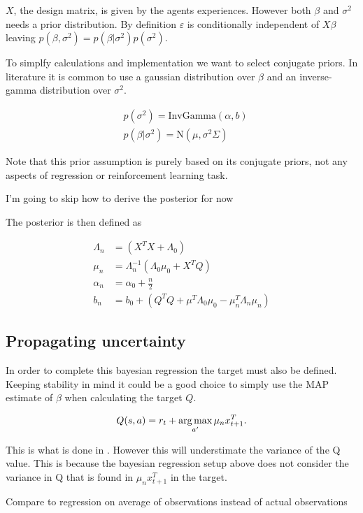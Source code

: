 $X$, the design matrix, is given by the agents experiences. However both $\beta$ and $\sigma^2$ needs a prior distribution. By definition $\varepsilon$ is conditionally independent of $X\beta$ leaving $p(\beta, \sigma^2) = p(\beta|\sigma^2)p(\sigma^2)$.

To simplfy calculations and implementation we want to select conjugate priors. In literature it is common to use a gaussian distribution over $\beta$ and an inverse-gamma distribution over $\sigma^2$.

\begin{align*}
&p(\sigma^2) = \text{InvGamma}(\alpha, b) \\
&p(\beta|\sigma^2) = \text{N}(\mu, \sigma^2\Sigma)
\end{align*}

Note that this prior assumption is purely based on its conjugate priors, not any aspects of regression or reinforcement learning task.

\todo I'm going to skip how to derive the posterior for now

The posterior is then defined as

\begin{align*}
\Lambda_n &= (X^TX + \Lambda_0)\\
\mu_n &= \Lambda_n^{-1}(\Lambda_0\mu_0 + X^TQ)\\
\alpha_n &= \alpha_0 + \frac{n}{2}\\
b_n &= b_0 + (Q^TQ + \mu^T\Lambda_0\mu_0 - \mu_n^T\Lambda_n\mu_n)
\end{align*}

\subsection{Propagating uncertainty}

In order to complete this bayesian regression the target must also be defined. Keeping stability in mind it could be a good choice to simply use the MAP estimate of $\beta$ when calculating the target $Q$.

\begin{equation*}
    Q(s,a) = r_t + \operatorname*{arg\,max}_{a'}\mu_nx_{t+1}^T.
\end{equation*}

This is what is done in \cite{azziz_2018}. However this will understimate the variance of the Q value. This is because the bayesian regression setup above does not consider the variance in Q that is found in $\mu_nx_{t+1}^T$ in the target.

\todo Compare to regression on average of observations instead of actual observations

